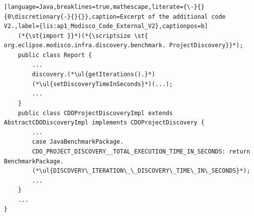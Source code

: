 \begin{lstlisting}[language=Java,breaklines=true,mathescape,literate={\-}{}{0\discretionary{-}{}{}},caption=Excerpt of the additional code V2.,label={lis:ap1_Modisco_Code_External_V2},captionpos=b]
	(*{\st{import }}*)(*{\scriptsize \st{ org.eclipse.modisco.infra.discovery.benchmark. ProjectDiscovery}}*);
	public class Report {
		...
		discovery.(*\ul{getIterations().}*) 
		(*\ul{setDiscoveryTimeInSeconds}*)(...);
		...
	}
	public class CDOProjectDiscoveryImpl extends AbstractCDODiscoveryImpl implements CDOProjectDiscovery {
		...
		case JavaBenchmarkPackage.
		CDO_PROJECT_DISCOVERY__TOTAL_EXECUTION_TIME_IN_SECONDS: return BenchmarkPackage.
		(*\ul{DISCOVERY\_ITERATION\_\_DISCOVERY\_TIME\_IN\_SECONDS}*);
		...
	}
	...
}
\end{lstlisting}

